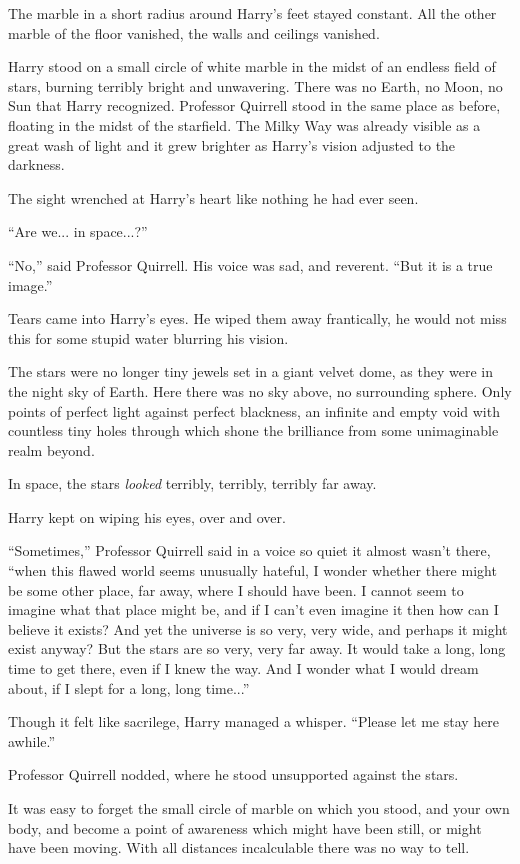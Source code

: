 The marble in a short radius around Harry's feet stayed constant. All
the other marble of the floor vanished, the walls and ceilings vanished.

Harry stood on a small circle of white marble in the midst of an endless
field of stars, burning terribly bright and unwavering. There was no
Earth, no Moon, no Sun that Harry recognized. Professor Quirrell stood
in the same place as before, floating in the midst of the starfield. The
Milky Way was already visible as a great wash of light and it grew
brighter as Harry's vision adjusted to the darkness.

The sight wrenched at Harry's heart like nothing he had ever seen.

``Are we... in space...?''

``No,'' said Professor Quirrell. His voice was sad, and reverent. ``But
it is a true image.''

Tears came into Harry's eyes. He wiped them away frantically, he would
not miss this for some stupid water blurring his vision.

The stars were no longer tiny jewels set in a giant velvet dome, as they
were in the night sky of Earth. Here there was no sky above, no
surrounding sphere. Only points of perfect light against perfect
blackness, an infinite and empty void with countless tiny holes through
which shone the brilliance from some unimaginable realm beyond.

In space, the stars \emph{looked} terribly, terribly, terribly far away.

Harry kept on wiping his eyes, over and over.

``Sometimes,'' Professor Quirrell said in a voice so quiet it almost
wasn't there, ``when this flawed world seems unusually hateful, I wonder
whether there might be some other place, far away, where I should have
been. I cannot seem to imagine what that place might be, and if I can't
even imagine it then how can I believe it exists? And yet the universe
is so very, very wide, and perhaps it might exist anyway? But the stars
are so very, very far away. It would take a long, long time to get
there, even if I knew the way. And I wonder what I would dream about, if
I slept for a long, long time...''

Though it felt like sacrilege, Harry managed a whisper. ``Please let me
stay here awhile.''

Professor Quirrell nodded, where he stood unsupported against the stars.

It was easy to forget the small circle of marble on which you stood, and
your own body, and become a point of awareness which might have been
still, or might have been moving. With all distances incalculable there
was no way to tell.

